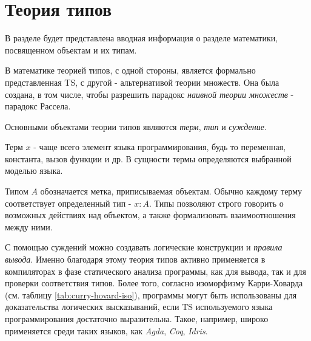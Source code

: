 \chapter{Теория типов}
\label{ch:type_theory}

В разделе будет представлена вводная информация о разделе математики, посвященном объектам и их типам.

В математике теорией типов, с одной стороны, является формально представленная \gls{TS}, с другой - альтернативой теории множеств.
Она была создана, в том числе, чтобы разрешить парадокс \textit{наивной теории множеств} - парадокс Рассела. \cite{TheFoundationsOfArithmetic}

Основными объектами теории типов являются \textit{терм}, \textit{тип} и \textit{суждение}.

Терм $x$ - чаще всего элемент языка программирования, будь то переменная, константа, вызов функции и др.
В сущности термы определяются выбранной моделью языка.

Типом $A$ обозначается метка, приписываемая объектам.
Обычно каждому терму соответствует определенный тип - $x: A$.
Типы позволяют строго говорить о возможных действиях над объектом, а также формализовать взаимоотношения между ними.

С помощью суждений можно создавать логические конструкции и \textit{правила вывода}.
Именно благодаря этому теория типов активно применяется в компиляторах в фазе статического анализа программы, как для вывода, так и для проверки соответствия типов.
Более того, согласно изоморфизму Карри-Ховарда (см. таблицу \ref{tab:curry-hovard-iso}), программы могут быть использованы для доказательства логических высказываний, если \gls{TS} используемого языка программирования достаточно выразительна.
Такое, например, широко применяется среди таких языков, как \textit{Agda}, \textit{Coq}, \textit{Idris}.

